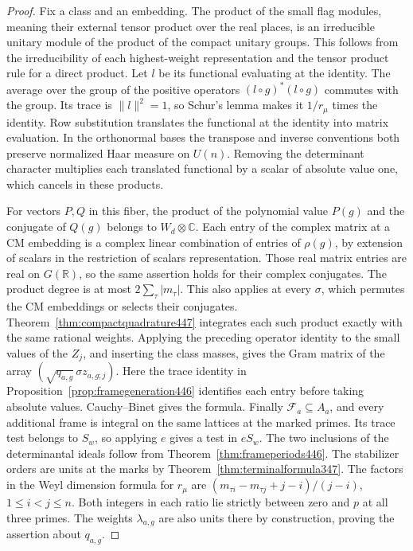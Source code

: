 \documentclass[a4paper,11pt]{article}
\theoremstyle{definition}
\theoremstyle{remark}
\numberwithin{equation}{section}
\begin{document}
\begin{proof}
Fix a class and an embedding. The product of the small flag
modules, meaning their external tensor product over the real
places, is an irreducible unitary module of the product of the
compact unitary groups. This follows from the irreducibility of
each highest-weight representation and the tensor product rule for
a direct product. Let \(l\) be its functional evaluating at the
identity. The average over the group of the positive operators
\((l\circ g)^*(l\circ g)\) commutes with the group. Its trace is
\(\|l\|^2=1\), so Schur's lemma makes it \(1/r_\mu\) times the
identity. Row substitution translates the functional at the
identity into matrix evaluation. In the orthonormal bases the
transpose and inverse conventions both preserve normalized Haar
measure on \(U(n)\). Removing the
determinant character multiplies each translated functional by
a scalar of absolute value one, which cancels in these products.

For vectors \(P,Q\) in this fiber, the product of the polynomial
value \(P(g)\) and the conjugate of \(Q(g)\) belongs to
\(W_d\otimes\mathbb C\). Each entry of the complex matrix at a
CM embedding is a complex linear combination of entries of
\(\rho(g)\), by extension of scalars in the restriction of
scalars representation. Those real matrix entries are real on
\(G(\mathbb R)\), so the same assertion holds for their complex
conjugates. The product degree is at most \(2\sum_\tau |m_\tau|\).
This also applies at every \(\sigma\), which permutes the CM
embeddings or selects their conjugates. Theorem~\ref{thm:compactquadrature447}
integrates each such product exactly with the same rational
weights. Applying the preceding operator identity to the small
values of the \(Z_j\), and inserting the class masses, gives the
Gram matrix of the array \((\sqrt{q_{a,g}}\,\sigma
z_{a,g;j})\). Here the trace identity in
Proposition~\ref{prop:framegeneration446} identifies each entry
before taking absolute values. Cauchy--Binet gives the formula.
Finally \(\mathcal F_a\subseteq A_a\), and every additional frame
is integral on the same lattices at the marked primes. Its trace
test belongs to \(S_w\), so applying \(e\) gives a test in \(eS_w\).
The two inclusions of the determinantal ideals follow from
Theorem~\ref{thm:frameperiods446}. The stabilizer orders are units
at the marks by Theorem~\ref{thm:terminalformula347}. The factors
in the Weyl dimension formula for \(r_\mu\) are
\((m_{\tau i}-m_{\tau j}+j-i)/(j-i)\), \(1\le i<j\le n\).
Both integers in each ratio lie strictly between zero and \(p\)
at all three primes. The weights \(\lambda_{a,g}\) are also units
there by construction, proving the assertion about \(q_{a,g}\).
\end{proof}
\end{document}
